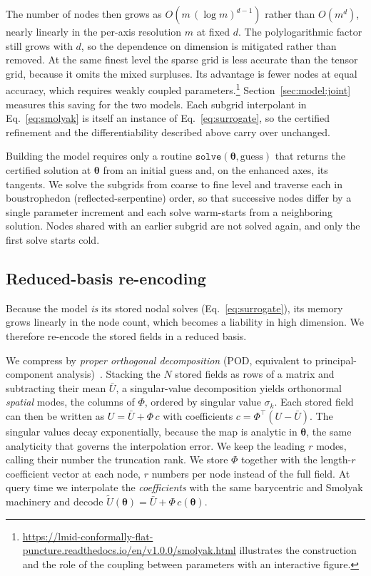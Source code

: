 \documentclass[
  aps,
  prd,
  twocolumn,
  10pt,
  amsmath,
  amssymb,
  nofootinbib,
  superscriptaddress,
  floatfix,
]{revtex4-2}
\newcommand{\vect}[1]{\boldsymbol{#1}}
\begin{document}
The number of nodes then grows as $O(m\,(\log m)^{d-1})$ rather than $O(m^d)$, nearly linearly in the per-axis resolution $m$ at fixed $d$.
The polylogarithmic factor still grows with $d$, so the dependence on dimension is mitigated rather than removed.
At the same finest level the sparse grid is less accurate than the tensor grid, because it omits the mixed surpluses.
Its advantage is fewer nodes at equal accuracy, which requires weakly coupled parameters.\footnote{\raggedright\url{https://lmid-conformally-flat-puncture.readthedocs.io/en/v1.0.0/smolyak.html} illustrates the construction and the role of the coupling between parameters with an interactive figure.}
Section~\ref{sec:model:joint} measures this saving for the two models.
Each subgrid interpolant in Eq.~\eqref{eq:smolyak} is itself an instance of Eq.~\eqref{eq:surrogate}, so the certified refinement and the differentiability described above carry over unchanged.

Building the model requires only a routine $\texttt{solve}(\vect{\theta},\mathrm{guess})$ that returns the certified solution at $\vect{\theta}$ from an initial guess and, on the enhanced axes, its tangents.
We solve the subgrids from coarse to fine level and traverse each in boustrophedon (reflected-serpentine) order, so that successive nodes differ by a single parameter increment and each solve warm-starts from a neighboring solution.
Nodes shared with an earlier subgrid are not solved again, and only the first solve starts cold.

\subsection{Reduced-basis re-encoding}
\label{sec:param:pod}
Because the model \emph{is} its stored nodal solves (Eq.~\ref{eq:surrogate}), its
memory grows linearly in the node count, which becomes a liability in
high dimension.
We therefore re-encode the stored fields in a reduced basis.

We compress by \emph{proper orthogonal decomposition} (POD, equivalent to
principal-component analysis)~\cite{Sirovich1987,BerkoozHolmesLumley1993}. Stacking
the $N$ stored fields as rows of a matrix and subtracting their mean $\bar U$, a
singular-value decomposition yields orthonormal \emph{spatial} modes, the columns of $\Phi$, ordered by singular value $\sigma_k$.
Each stored field can then be written as $U=\bar U + \Phi\,c$ with coefficients $c=\Phi^{\!\top}(U-\bar U)$.
The singular values decay exponentially, because the map is analytic in $\vect{\theta}$, the same analyticity that governs the interpolation error.
We keep the leading $r$ modes, calling their number the truncation rank.
We store $\Phi$ together with the length-$r$ coefficient vector at each node, $r$ numbers per node instead of the full field.
At query time we interpolate the \emph{coefficients} with the same barycentric and Smolyak machinery and decode $\tilde U(\vect{\theta})=\bar U+\Phi\,c(\vect{\theta})$.
\end{document}
